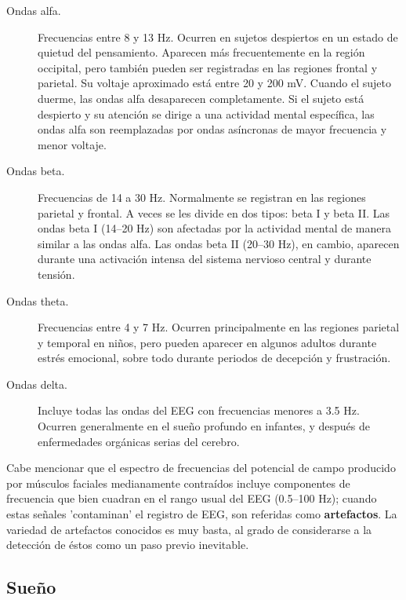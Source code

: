 \documentclass[12pt,a4paper]{mitthesis}
\begin{document}
\begin{description}
\item[Ondas alfa.] Frecuencias entre 8 y 13 Hz. Ocurren en sujetos despiertos en un estado de 
quietud del pensamiento. Aparecen m\'as frecuentemente en la regi\'on occipital, pero tambi\'en 
pueden ser registradas en las regiones frontal y parietal. Su voltaje aproximado est\'a entre 20 y 
200 mV. Cuando el sujeto duerme, las ondas alfa desaparecen completamente. Si el sujeto est\'a
despierto y su atenci\'on se dirige a una actividad mental espec\'ifica, las ondas alfa son 
reemplazadas por ondas as\'incronas de mayor frecuencia y menor voltaje.

\item[Ondas beta.] Frecuencias de 14 a 30 Hz. Normalmente se registran en las regiones parietal y 
frontal. A veces se les divide en dos tipos: beta I y beta II. Las ondas beta I (14--20 Hz) son 
afectadas por la actividad mental de manera similar a las ondas alfa.
Las ondas beta II (20--30 Hz), en cambio, aparecen durante una activaci\'on intensa del sistema 
nervioso central y durante tensi\'on.

\item[Ondas theta.] Frecuencias entre 4 y 7 Hz. Ocurren principalmente en las regiones parietal y 
temporal en ni\~nos, pero pueden aparecer en algunos adultos durante estr\'es emocional, sobre 
todo durante periodos de decepci\'on y frustraci\'on.

\item[Ondas delta.] Incluye todas las ondas del EEG con frecuencias menores a 3.5 Hz. Ocurren 
generalmente en el sue\~no profundo en infantes, y despu\'es de enfermedades org\'anicas serias del 
cerebro.
\end{description}

Cabe mencionar que el espectro de frecuencias del potencial de campo producido por m\'usculos 
faciales medianamente contra\'idos incluye componentes de frecuencia que bien cuadran en el rango 
usual del EEG (0.5--100 Hz); cuando estas se\~nales 'contaminan' el registro de EEG, son referidas
como \textbf{artefactos}. La variedad de artefactos conocidos es muy basta, al grado de
considerarse a la detecci\'on de \'estos como un paso previo inevitable.


\subsection{Sue\~no}
\end{document}

